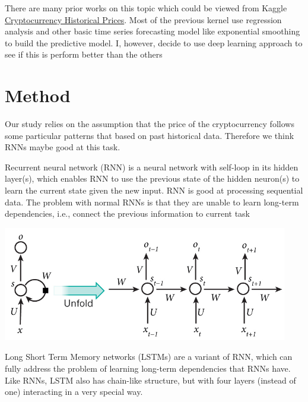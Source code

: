 \documentclass[a4paper,11pt]{article}
\begin{document}

\noindent There are many prior works on this topic which could be viewed from Kaggle \href{https://www.kaggle.com/sudalairajkumar/cryptocurrencypricehistory/kernels}{Cryptocurrency Historical Prices}. Most of the previous kernel use regression analysis and other basic time series forecasting model like exponential smoothing to build the predictive model. I, however, decide to use deep learning approach to see if this is perform better than the others	

\section{Method}

\noindent Our study relies on the assumption that the price of the cryptocurrency follows some particular patterns that based on past historical data. Therefore we think RNNs maybe good at this task.

\noindent Recurrent neural network (RNN) is a neural network with self-loop in its hidden layer(s), which enables RNN to use the previous state of the hidden neuron(s) to learn the current state given the new input. RNN is good at processing sequential data. The problem with normal RNNs is that they are unable to learn long-term dependencies, i.e., connect the previous information to current task


\includegraphics[height = 5cm]{figure1.jpg}

\noindent Long Short Term Memory networks (LSTMs) are a variant of RNN, which can fully address the problem of learning long-term dependencies that RNNs have. Like RNNs, LSTM also has chain-like structure, but with four layers (instead of one) interacting in a very special way.
\end{document}
